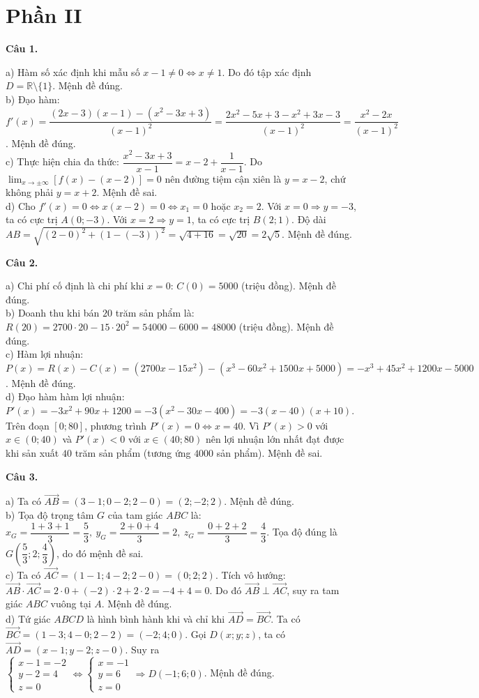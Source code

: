 \documentclass[12pt,a4paper]{article}
\newcommand{\loigiai}[1]{\par\medskip\Needspace{4\baselineskip}\noindent\textbf{#1}\par\nobreak}
\begin{document}
\section*{\large Phần II}
\loigiai{Câu 1.}
a) Hàm số xác định khi mẫu số $x-1\ne 0\Leftrightarrow x\ne 1$. Do đó tập xác định $D=\mathbb{R}\setminus\{1\}$. Mệnh đề đúng.\\
b) Đạo hàm: $f'(x)=\dfrac{(2x-3)(x-1)-(x^2-3x+3)}{(x-1)^2}=\dfrac{2x^2-5x+3-x^2+3x-3}{(x-1)^2}=\dfrac{x^2-2x}{(x-1)^2}$. Mệnh đề đúng.\\
c) Thực hiện chia đa thức: $\dfrac{x^2-3x+3}{x-1}=x-2+\dfrac{1}{x-1}$.
Do $\lim_{x\to\pm\infty}[f(x)-(x-2)]=0$ nên đường tiệm cận xiên là $y=x-2$, chứ không phải $y=x+2$. Mệnh đề sai.\\
d) Cho $f'(x)=0\Leftrightarrow x(x-2)=0\Leftrightarrow x_1=0$ hoặc $x_2=2$.
Với $x=0\Rightarrow y=-3$, ta có cực trị $A(0;-3)$.
Với $x=2\Rightarrow y=1$, ta có cực trị $B(2;1)$.
Độ dài $AB=\sqrt{(2-0)^2+(1-(-3))^2}=\sqrt{4+16}=\sqrt{20}=2\sqrt{5}$. Mệnh đề đúng.

\loigiai{Câu 2.}
a) Chi phí cố định là chi phí khi $x=0$: $C(0)=5000$ (triệu đồng). Mệnh đề đúng.\\
b) Doanh thu khi bán $20$ trăm sản phẩm là: $R(20)=2700\cdot 20-15\cdot 20^2=54000-6000=48000$ (triệu đồng). Mệnh đề đúng.\\
c) Hàm lợi nhuận: $P(x)=R(x)-C(x)=(2700x-15x^2)-(x^3-60x^2+1500x+5000)=-x^3+45x^2+1200x-5000$. Mệnh đề đúng.\\
d) Đạo hàm hàm lợi nhuận: $P'(x)=-3x^2+90x+1200=-3(x^2-30x-400)=-3(x-40)(x+10)$.
Trên đoạn $[0;80]$, phương trình $P'(x)=0\Leftrightarrow x=40$.
Vì $P'(x)>0$ với $x\in(0;40)$ và $P'(x)<0$ với $x\in(40;80)$ nên lợi nhuận lớn nhất đạt được khi sản xuất $40$ trăm sản phẩm (tương ứng $4000$ sản phẩm). Mệnh đề sai.

\loigiai{Câu 3.}
a) Ta có $\vec{AB}=(3-1;0-2;2-0)=(2;-2;2)$. Mệnh đề đúng.\\
b) Tọa độ trọng tâm $G$ của tam giác $ABC$ là:
$x_G=\dfrac{1+3+1}{3}=\dfrac{5}{3},\ y_G=\dfrac{2+0+4}{3}=2,\ z_G=\dfrac{0+2+2}{3}=\dfrac{4}{3}$.
Tọa độ đúng là $G\left(\dfrac{5}{3};2;\dfrac{4}{3}\right)$, do đó mệnh đề sai.\\
c) Ta có $\vec{AC}=(1-1;4-2;2-0)=(0;2;2)$.
Tích vô hướng: $\vec{AB}\cdot\vec{AC}=2\cdot 0+(-2)\cdot 2+2\cdot 2=-4+4=0$.
Do đó $\vec{AB}\perp\vec{AC}$, suy ra tam giác $ABC$ vuông tại $A$. Mệnh đề đúng.\\
d) Tứ giác $ABCD$ là hình bình hành khi và chỉ khi $\vec{AD}=\vec{BC}$.
Ta có $\vec{BC}=(1-3;4-0;2-2)=(-2;4;0)$.
Gọi $D(x;y;z)$, ta có $\vec{AD}=(x-1;y-2;z-0)$.
Suy ra $\begin{cases}x-1=-2\\y-2=4\\z=0\end{cases}\Leftrightarrow\begin{cases}x=-1\\y=6\\z=0\end{cases}\Rightarrow D(-1;6;0)$. Mệnh đề đúng.
\end{document}
